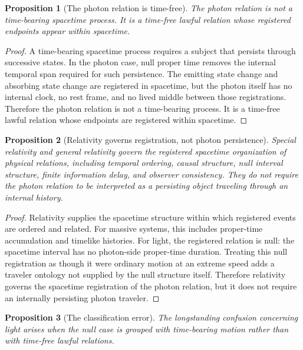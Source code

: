 \documentclass[12pt,onecolumn]{article}
\newtheorem{proposition}{Proposition}
\begin{document}
\begin{proposition}[The photon relation is time-free]
The photon relation is not a time-bearing spacetime process. It is a time-free lawful relation whose registered endpoints appear within spacetime.
\end{proposition}

\begin{proof}
A time-bearing spacetime process requires a subject that persists through successive states. In the photon case, null proper time removes the internal temporal span required for such persistence. The emitting state change and absorbing state change are registered in spacetime, but the photon itself has no internal clock, no rest frame, and no lived middle between those registrations. Therefore the photon relation is not a time-bearing process. It is a time-free lawful relation whose endpoints are registered within spacetime.
\end{proof}

\begin{proposition}[Relativity governs registration, not photon persistence]
Special relativity and general relativity govern the registered spacetime organization of physical relations, including temporal ordering, causal structure, null interval structure, finite information delay, and observer consistency. They do not require the photon relation to be interpreted as a persisting object traveling through an internal history.
\end{proposition}

\begin{proof}
Relativity supplies the spacetime structure within which registered events are ordered and related. For massive systems, this includes proper-time accumulation and timelike histories. For light, the registered relation is null: the spacetime interval has no photon-side proper-time duration. Treating this null registration as though it were ordinary motion at an extreme speed adds a traveler ontology not supplied by the null structure itself. Therefore relativity governs the spacetime registration of the photon relation, but it does not require an internally persisting photon traveler.
\end{proof}

\begin{proposition}[The classification error]
The longstanding confusion concerning light arises when the null case is grouped with time-bearing motion rather than with time-free lawful relations.
\end{proposition}
\end{document}
